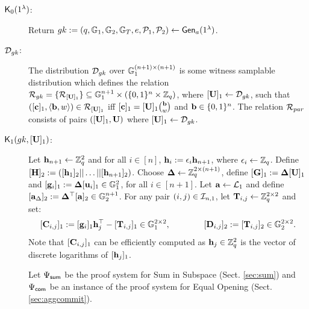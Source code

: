 \begin{description} \label{bits-proof-system}

\item[$\mathsf{K}_0(1^\lambda)$:]  Return $gk := (q,\mathbb{G}_1,\mathbb{G}_2,\mathbb{G}_T,e,\mathcal{P}_1,\mathcal{P}_2) \leftarrow \mathsf{Gen}_a(1^{\lambda})$.

\item[$\mathcal{D}_{gk}$:] The distribution $\mathcal{D}_{gk}$ over $\mathbb{G}_1^{(n+1) \times (n+1)}$ is some witness samplable distribution which 
defines the relation $\mathcal{R}_{gk} = \{\mathcal{R}_{[\mathbf{{U}}]_1}\} 
\subseteq \mathbb{G}_1^{n+1}\times(\{0,1\}^{n}\times\mathbb{Z}_q)$,
where $[\mathbf{{U}}]_1\gets\mathcal{D}_{gk}$,
such that $([\mathbf{c}]_1,\langle\mathbf{b}, w\rangle)\in\mathcal{R}_{[\mathbf{{U}}]_1}$ iff
$[\mathbf{c}]_1=[\mathbf{{U}}]_1\binom{\mathbf{b}}{w}$ and $\mathbf{b}\in\{0,1\}^n$. The relation $\mathcal{R}_{par}$ consists of pairs $([\mathbf{{U}}]_1,\mathbf{{U}})$ where $[\mathbf{{U}}]_1 \gets \mathcal{D}_{{gk}}$.
\item[$\mathsf{K}_1({gk}, {[\mathbf{{U}}]_1})$:]
Let $\mathbf{h}_{n+1}\gets \mathbb{Z}_q^2$
and for all $i \in [n]$, $\mathbf{h}_{i}:=\epsilon_{i}\mathbf{h}_{n+1}$, where
$\epsilon_{i} \leftarrow \mathbb{Z}_q$. Define
$[{\mathbf{{H}}}]_2 := ([\mathbf{h}_1]_2|| \ldots ||[\mathbf{h}_{n+1}]_2)$.
Choose 
$\mathbf{{\Delta}} \leftarrow \mathbb{Z}_q^{2 \times (n+1)}$,
define $[\mathbf{{G}}]_1 := \mathbf{{\Delta}}[\mathbf{{U}}]_1$
and $[\mathbf{g}_{i}]_1:=\mathbf{{\Delta}} [\mathbf{u}_i]_1 \in \mathbb{G}_1^2$, for all $i \in [n+1]$. 
Let $\mathbf{a} \leftarrow \mathcal{L}_{1}$ and define $[\mathbf{a}_{\Delta}]_2:=\mathbf{{\Delta}}^\top[\mathbf{a}]_2 \in \mathbb{G}_2^{n+1}$. 
For any pair $(i,j) \in \mathcal{I}_{n,1}$, let 
$\mathbf{{T}}_{i,j}\gets\mathbb{Z}_q^{2\times2}$ and set:
$$[\mathbf{{C}}_{i,j}]_1:=[\mathbf{g}_i]_1 \mathbf{h}_j^{\top} - [\mathbf{{T}}_{i,j}]_1  \in \mathbb{G}_1^{2 \times 2},
\qquad \qquad 
[\mathbf{{D}}_{i,j}]_2:=[\mathbf{{T}}_{i,j}]_2 \in \mathbb{G}_2^{2 \times 2}.$$ 
Note that $[\mathbf{{C}}_{i,j}]_1$ can be efficiently computed 
as $\mathbf{h}_j \in \mathbb{Z}_q^{2}$ is the vector of discrete logarithms of $[\mathbf{h}_j]_1$.

Let ${\Psi_{\mathsf{sum}}}$ be the proof system for Sum in Subspace 
(Sect. \ref{sec:sum}) and ${\Psi_{\mathsf{com}}}$
be an instance of the proof system for Equal Opening (Sect. \ref{sec:aggcommit}).


\end{description}
